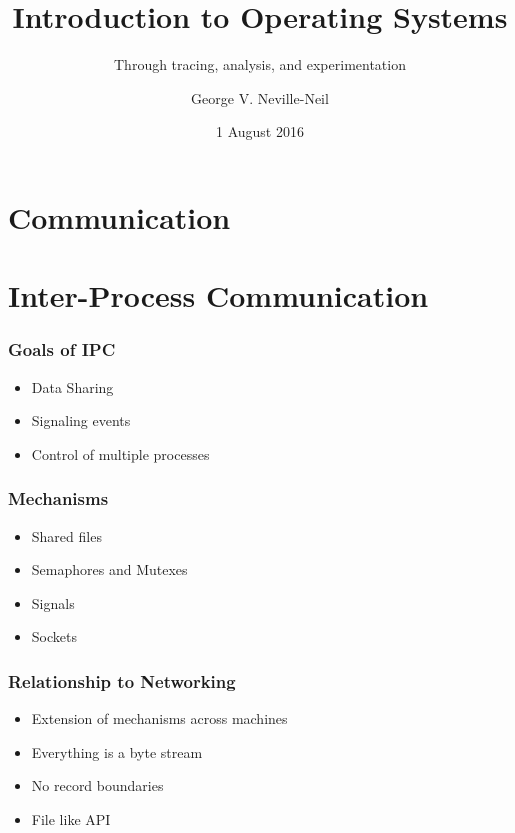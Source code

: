 \documentclass[pdftex]{beamer} %
\begin{document}

\title{Introduction to Operating Systems}
\subtitle{Through tracing, analysis, and experimentation}
\author{George V. Neville-Neil}
\date{1 August 2016}

\begin{frame}
  \titlepage
\end{frame}

\section{Communication}
\label{sec:communication}

\section{Inter-Process Communication}
\label{sec:ipc}

\begin{frame}
  \frametitle{Goals of IPC}
  \begin{itemize}
  \item Data Sharing
  \item Signaling events
  \item Control of multiple processes
  \end{itemize}
\end{frame}

\begin{frame}
  \frametitle{Mechanisms}
  \begin{itemize}
  \item Shared files
  \item Semaphores and Mutexes
  \item Signals
  \item Sockets
  \end{itemize}
\end{frame}

\begin{frame}
  \frametitle{Relationship to Networking}
  \begin{itemize}
  \item Extension of mechanisms across machines
  \item Everything is a byte stream
  \item No record boundaries
  \item File like API
  \end{itemize}
\end{frame}
\end{document}

